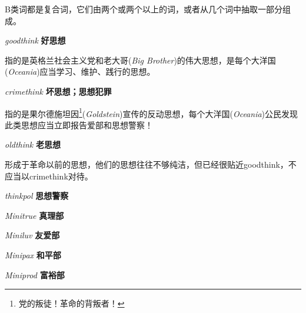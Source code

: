 \documentclass[lang=cn, color=black]{elegantbook}
\newenvironment{word}[2]{
    \noindent \textit{#1} \quad \textbf{#2} \\
    \indent
}{}
\newcommand{\ingsoc}{英格兰社会主义党}
\newcommand{\bb}{老大哥(\textit{Big Brother})}
\newcommand{\oceania}{大洋国(\textit{Oceania})}
\newcommand{\gold}{果尔德施坦因\footnote{党的叛徒！革命的背叛者！}(\textit{Goldstein})}
\begin{document}
                B类词都是复合词，它们由两个或两个以上的词，或者从几个词中抽取一部分组成。

                \begin{multicols}{2}
                    \begin{word}{goodthink}{好思想}
                        指的是\ingsoc 和\bb 的伟大思想，是每个\oceania 应当学习、维护、践行的思想。
                    \end{word}
                    
                    \begin{word}{crimethink}{坏思想；思想犯罪}
                        指的是\gold 宣传的反动思想，每个\oceania 公民发现此类思想应当立即报告爱部和思想警察！
                    \end{word}

                    \begin{word}{oldthink}{老思想}
                        形成于革命以前的思想，他们的思想往往不够纯洁，但已经很贴近goodthink，不应当以crimethink对待。
                    \end{word}

                    \begin{word}{thinkpol}{思想警察}\end{word}

                    \begin{word}{Minitrue}{真理部}\end{word}

                    \begin{word}{Miniluv}{友爱部}\end{word}

                    \begin{word}{Minipax}{和平部}\end{word}

                    \begin{word}{Miniprod}{富裕部}\end{word}
                \end{multicols}
\end{document}
